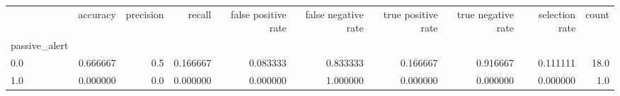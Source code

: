 \begin{tabular}{lrrrrrrrrr}
\toprule
{} &  accuracy &  precision &    recall &  false positive rate &  false negative rate &  true positive rate &  true negative rate &  selection rate &  count \\
passive\_alert &           &            &           &                      &                      &                     &                     &                 &        \\
\midrule
0.0           &  0.666667 &        0.5 &  0.166667 &             0.083333 &             0.833333 &            0.166667 &            0.916667 &        0.111111 &   18.0 \\
1.0           &  0.000000 &        0.0 &  0.000000 &             0.000000 &             1.000000 &            0.000000 &            0.000000 &        0.000000 &    1.0 \\
\bottomrule
\end{tabular}
